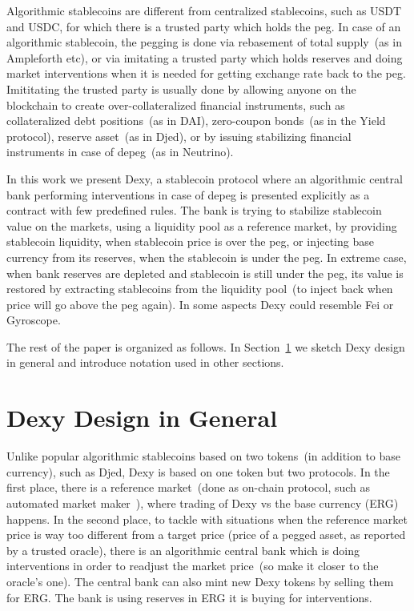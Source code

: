 \documentclass{article}   %
\newcommand{\authnote}[2]{\marginpar{\parbox{\marginparwidth}{\tiny %
  \textsf{#1 {\textcolor{blue}{notes: #2}}}}}%
  \textcolor{blue}{\textbf{\dag}}}
\newcommand{\authnote}[2]{
  \textsf{#1 \textcolor{blue}{: #2}}}
\newcommand{\authnote}[2]{}
\newcommand{\knote}[1]{{\authnote{\textcolor{green}{Alex notes}}{#1}}}
\newcommand{\bc}{ERG}
\newcommand{\dx}{Dexy}
\begin{document}
Algorithmic stablecoins are different from centralized stablecoins, such as USDT and USDC, for which there is a trusted party which holds the peg. In case of an algorithmic stablecoin, the 
pegging is done via rebasement of total supply~(as in Ampleforth etc), or via imitating a trusted party which holds reserves and doing market interventions when it is needed for getting exchange rate back to the peg. Imititating the trusted party is usually done by allowing anyone on the blockchain to create over-collateralized financial instruments, such as collateralized debt positions~(as 
in DAI), zero-coupon bonds~(as in the Yield protocol), reserve asset~(as in Djed), or by issuing stabilizing financial instruments in case of depeg~(as in Neutrino). \knote{add links to the paragraph above}

In this work we present \dx{}, a stablecoin protocol where an algorithmic central bank performing interventions in case of depeg is presented explicitly as a contract with few predefined rules. The bank is trying to stabilize stablecoin value on the markets, using a liquidity pool as a reference market, by providing stablecoin liquidity, when stablecoin price is over the peg, or injecting base currency from its reserves, when the stablecoin is under the peg. In extreme case, when bank reserves are depleted and stablecoin is still under the peg, its value is restored by extracting stablecoins from the liquidity pool~(to inject back when price will go above the peg again). In some aspects \dx{} could resemble Fei or Gyroscope. \knote{make comparison subsection}  

The rest of the paper is organized as follows.  In Section~\ref{design-general} we sketch \dx{} design in general and
introduce notation used in other sections.

\knote{finish}


\section{\dx{} Design in General}
\label{design-general}

Unlike popular algorithmic stablecoins based on two tokens~(in addition to base currency), such as Djed, \dx{} is based on one token but two protocols. In the first place,
there is a reference market~(done as on-chain protocol, such as automated market maker~\cite{xu2021sok}), where trading of \dx{} vs the base currency (\bc{}) happens. In the second place, to tackle with situations when the reference market price is way too different from a target price (price of a pegged asset, as reported by a trusted oracle), there is an algorithmic central bank which is doing interventions in order to readjust the market price~(so make it closer to the oracle's one). The central bank can also mint new \dx{} tokens by selling them for \bc{}. The bank is using reserves in \bc{} it is buying for interventions. 
\end{document}
